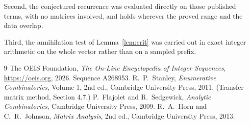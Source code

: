 \documentclass[11pt,a4paper]{article}
\theoremstyle{plain}
\theoremstyle{definition}
\begin{document}
Second, the conjectured recurrence was evaluated directly on those published terms, with no
matrices involved, and holds wherever the proved range and the data overlap.

Third, the annihilation test of Lemma~\ref{lem:crit} was carried out in exact integer
arithmetic on the whole vector rather than on a sampled prefix.

\begin{thebibliography}{9}
 The OEIS Foundation, \emph{The On-Line Encyclopedia of Integer
Sequences}, \url{https://oeis.org}, 2026. Sequence A268953.
 R.~P.~Stanley, \emph{Enumerative Combinatorics}, Volume 1, 2nd ed.,
Cambridge University Press, 2011. (Transfer-matrix method, Section 4.7.)
 P.~Flajolet and R.~Sedgewick, \emph{Analytic Combinatorics}, Cambridge
University Press, 2009.
 R.~A.~Horn and C.~R.~Johnson, \emph{Matrix Analysis}, 2nd ed., Cambridge
University Press, 2013.
\end{thebibliography}
\end{document}
